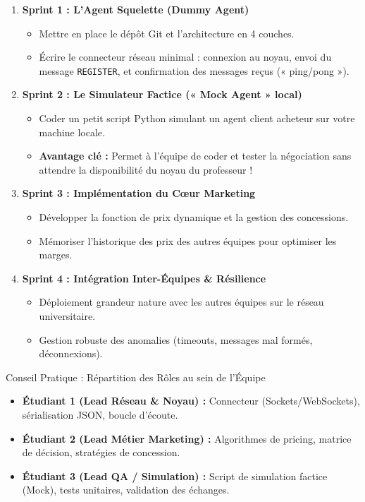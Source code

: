 \documentclass[11pt,a4paper]{article}
\begin{document}
\begin{enumerate}[leftmargin=*, itemsep=2.5pt]
    \item \textbf{Sprint 1 : L'Agent Squelette (Dummy Agent)}
    \begin{itemize}[itemsep=1pt]
        \item Mettre en place le dépôt Git et l'architecture en 4 couches.
        \item Écrire le connecteur réseau minimal : connexion au noyau, envoi du message \texttt{REGISTER}, et confirmation des messages reçus (« ping/pong »).
    \end{itemize}

    \item \textbf{Sprint 2 : Le Simulateur Factice (« Mock Agent » local)}
    \begin{itemize}[itemsep=1pt]
        \item Coder un petit script Python simulant un agent client acheteur sur votre machine locale.
        \item \textbf{Avantage clé :} Permet à l'équipe de coder et tester la négociation sans attendre la disponibilité du noyau du professeur !
    \end{itemize}

    \item \textbf{Sprint 3 : Implémentation du Cœur Marketing}
    \begin{itemize}[itemsep=1pt]
        \item Développer la fonction de prix dynamique et la gestion des concessions.
        \item Mémoriser l'historique des prix des autres équipes pour optimiser les marges.
    \end{itemize}

    \item \textbf{Sprint 4 : Intégration Inter-Équipes \& Résilience}
    \begin{itemize}[itemsep=1pt]
        \item Déploiement grandeur nature avec les autres équipes sur le réseau universitaire.
        \item Gestion robuste des anomalies (timeouts, messages mal formés, déconnexions).
    \end{itemize}
\end{enumerate}

\begin{marketingbox}{Conseil Pratique : Répartition des Rôles au sein de l'Équipe}
\begin{itemize}[leftmargin=*, itemsep=1.5pt]
    \item \textbf{Étudiant 1 (Lead Réseau \& Noyau) :} Connecteur (Sockets/WebSockets), sérialisation JSON, boucle d'écoute.
    \item \textbf{Étudiant 2 (Lead Métier Marketing) :} Algorithmes de pricing, matrice de décision, stratégies de concession.
    \item \textbf{Étudiant 3 (Lead QA / Simulation) :} Script de simulation factice (Mock), tests unitaires, validation des échanges.
\end{itemize}
\end{marketingbox}
\end{document}
